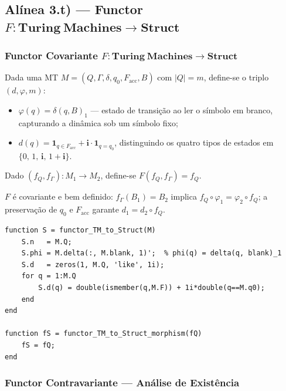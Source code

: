 \subsection{Alínea 3.t) --- Functor $F: \mathbf{Turing\ Machines} \to \mathbf{Struct}$}
\label{subsec:functor-turing-struct}
\subsubsection{Functor Covariante $F: \mathbf{Turing\ Machines} \to \mathbf{Struct}$}

\begin{definition}
Dada uma MT $M=(Q,\Gamma,\delta,q_0,F_{\mathrm{acc}},B)$ com $|Q|=m$, define-se o triplo $(d,\varphi,m)$:
\begin{itemize}
    \item $\varphi(q) = \delta(q, B)_1$ — estado de transição ao ler o símbolo em branco, capturando a dinâmica sob um símbolo fixo;
    \item $d(q) = \mathbf{1}_{q \in F_{\mathrm{acc}}} + \mathbf{i}\cdot\mathbf{1}_{q=q_0}$, distinguindo os quatro tipos de estados em $\{0,\,1,\,\mathbf{i},\,1{+}\mathbf{i}\}$.
\end{itemize}
Dado $(f_Q, f_\Gamma): M_1 \to M_2$, define-se $F(f_Q,f_\Gamma) = f_Q$.
\end{definition}

\begin{proposition}
$F$ é covariante e bem definido: $f_\Gamma(B_1)=B_2$ implica $f_Q \circ \varphi_1 = \varphi_2 \circ f_Q$; a preservação de $q_0$ e $F_{\mathrm{acc}}$ garante $d_1 = d_2 \circ f_Q$.
\end{proposition}

\begin{lstlisting}[style=matlab, caption={Functor covariante $F: \mathbf{Turing\ Machines} \to \mathbf{Struct}$}]
function S = functor_TM_to_Struct(M)
    S.n   = M.Q;
    S.phi = M.delta(:, M.blank, 1)';  % phi(q) = delta(q, blank)_1
    S.d   = zeros(1, M.Q, 'like', 1i);
    for q = 1:M.Q
        S.d(q) = double(ismember(q,M.F)) + 1i*double(q==M.q0);
    end
end

function fS = functor_TM_to_Struct_morphism(fQ)
    fS = fQ;
end
\end{lstlisting}

\subsubsection{Functor Contravariante --- Análise de Existência}

